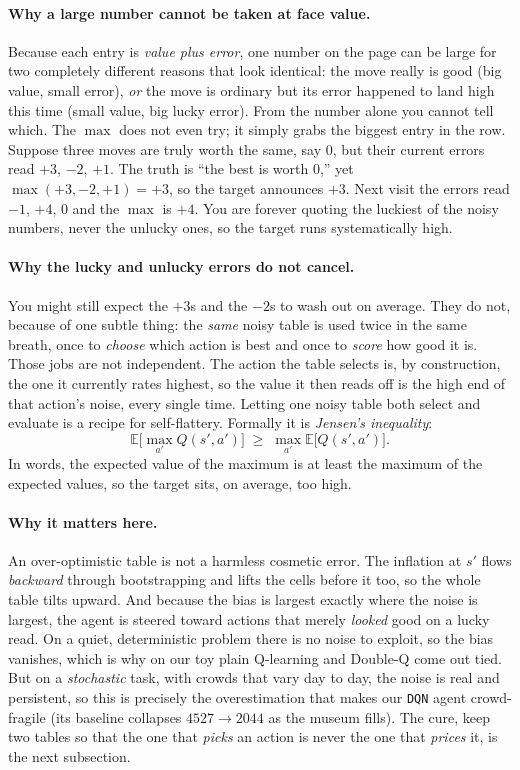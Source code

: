 \documentclass[11pt]{article}
\newcommand{\key}[1]{\textit{#1}}            %
\begin{document}
\paragraph{Why a large number cannot be taken at face value.} Because each entry is \emph{value plus error}, one number on the page can
be large for two completely different reasons that look identical: the move really is good (big
value, small error), \emph{or} the move is ordinary but its error happened to land high this time
(small value, big lucky error). From the number alone you cannot tell which. The $\max$ does not even
try; it simply grabs the biggest entry in the row. Suppose three moves are truly worth the same, say
$0$, but their current errors read $+3$, $-2$, $+1$. The truth is ``the best is worth $0$,'' yet
$\max(+3,-2,+1)=+3$, so the target announces $+3$. Next visit the errors read $-1$, $+4$, $0$ and the
$\max$ is $+4$. You are forever quoting the luckiest of the noisy numbers, never the unlucky ones, so
the target runs systematically high.

\paragraph{Why the lucky and unlucky errors do not cancel.} You might still expect the $+3$s and the
$-2$s to wash out on average. They do not, because of one subtle thing: the \emph{same} noisy table is
used twice in the same breath, once to \emph{choose} which action is best and once to \emph{score} how
good it is. Those jobs are not independent. The action the table selects is, by construction, the one
it currently rates highest, so the value it then reads off is the high end of that action's noise,
every single time. Letting one noisy table both select and evaluate is a recipe for self-flattery.
Formally it is \key{Jensen's inequality}:
\begin{equation}
\mathbb{E}\Big[\max_{a'} Q(s',a')\Big] \;\ge\; \max_{a'} \mathbb{E}\big[Q(s',a')\big].
\label{eq:jensen}
\end{equation}
In words, the expected value of the maximum is at least the maximum of the expected values, so the
target sits, on average, too high.

\paragraph{Why it matters here.} An over-optimistic table is not a harmless cosmetic error. The
inflation at $s'$ flows \emph{backward} through bootstrapping and lifts the cells before it too,
so the whole table tilts upward. And because the bias is largest exactly where the noise is
largest, the agent is steered toward actions that merely \emph{looked} good on a lucky read. On
a quiet, deterministic problem there is no noise to exploit, so the bias vanishes, which is why
on our toy plain Q-learning and Double-Q come out tied. But on a \emph{stochastic} task, with
crowds that vary day to day, the noise is real and persistent, so this is precisely the
overestimation that makes our \texttt{DQN} agent crowd-fragile (its baseline collapses
$4527 \to 2044$ as the museum fills). The cure, keep two tables so that the one that
\emph{picks} an action is never the one that \emph{prices} it, is the next subsection.
\end{document}
